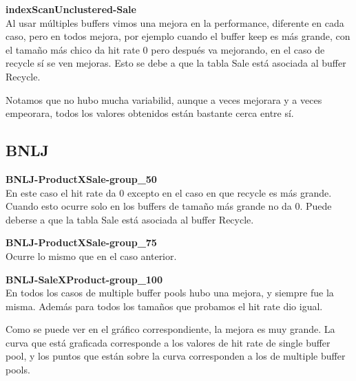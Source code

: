 \vspace*{0.5cm}

\textbf{indexScanUnclustered-Sale} \\

Al usar múltiples buffers vimos una mejora en la performance, 
diferente en cada caso, pero en todos mejora, por ejemplo cuando
el buffer keep es más grande, con el tamaño más chico da hit rate
0 pero después va mejorando, en el caso de recycle sí se ven mejoras.
Esto se debe a que la tabla Sale está asociada al buffer Recycle. 

Notamos que no hubo mucha variabilid, aunque a veces mejorara y 
a veces empeorara, todos los valores obtenidos están bastante
cerca entre sí.



\subsection{BNLJ}

\textbf{BNLJ-ProductXSale-group\_50} \\

En este caso el hit rate da 0 excepto en el caso en que recycle
es más grande. Cuando esto ocurre solo en los buffers de tamaño
más grande no da 0. Puede deberse a que la tabla Sale está 
asociada al buffer Recycle. 

\vspace*{0.5cm}

\textbf{BNLJ-ProductXSale-group\_75} \\

Ocurre lo mismo que en el caso anterior.


\vspace*{0.5cm}

\textbf{BNLJ-SaleXProduct-group\_100} \\

En todos los casos de multiple buffer pools hubo una mejora, 
y siempre fue la misma. Además para todos los tamaños que
probamos el hit rate dio igual.

\vspace*{0.3cm}

Como se puede ver en el gráfico correspondiente, la mejora 
es muy grande. La curva que está graficada corresponde a los 
valores de hit rate de single buffer pool, y los puntos que están
sobre la curva corresponden a los de multiple buffer pools.


\vspace*{0.5cm}


